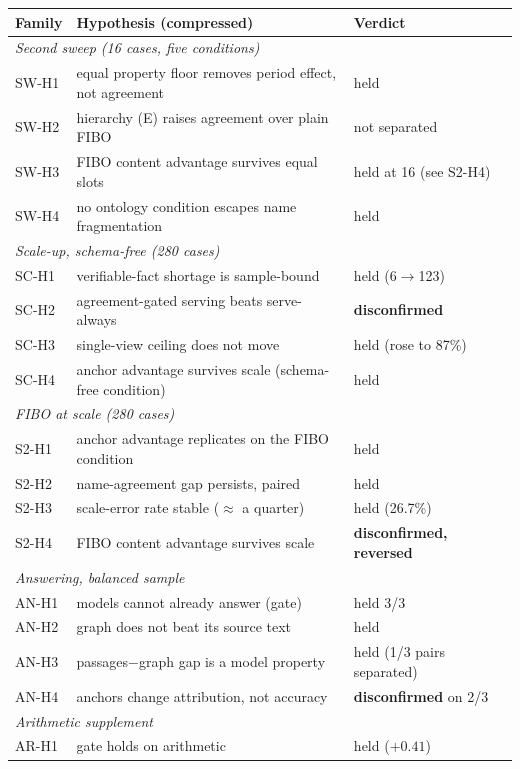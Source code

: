 \documentclass{article}
\begin{document}
\begin{table}[h]
\centering\footnotesize
\setlength{\tabcolsep}{3pt}
\begin{tabular}{llll}
\toprule
Family & Hypothesis (compressed) & Verdict \\
\midrule
\multicolumn{3}{l}{\emph{Second sweep (16 cases, five conditions)}} \\
SW-H1 & equal property floor removes period effect, not agreement & held \\
SW-H2 & hierarchy (E) raises agreement over plain FIBO & not separated \\
SW-H3 & FIBO content advantage survives equal slots & held at 16 (see S2-H4) \\
SW-H4 & no ontology condition escapes name fragmentation & held \\
\midrule
\multicolumn{3}{l}{\emph{Scale-up, schema-free (280 cases)}} \\
SC-H1 & verifiable-fact shortage is sample-bound & held (6$\to$123) \\
SC-H2 & agreement-gated serving beats serve-always & \textbf{disconfirmed} \\
SC-H3 & single-view ceiling does not move & held (rose to 87\%) \\
SC-H4 & anchor advantage survives scale (schema-free condition) & held \\
\midrule
\multicolumn{3}{l}{\emph{FIBO at scale (280 cases)}} \\
S2-H1 & anchor advantage replicates on the FIBO condition & held \\
S2-H2 & name-agreement gap persists, paired & held \\
S2-H3 & scale-error rate stable ($\approx$ a quarter) & held (26.7\%) \\
S2-H4 & FIBO content advantage survives scale & \textbf{disconfirmed, reversed} \\
\midrule
\multicolumn{3}{l}{\emph{Answering, balanced sample}} \\
AN-H1 & models cannot already answer (gate) & held 3/3 \\
AN-H2 & graph does not beat its source text & held \\
AN-H3 & passages$-$graph gap is a model property & held (1/3 pairs separated) \\
AN-H4 & anchors change attribution, not accuracy & \textbf{disconfirmed} on 2/3 \\
\midrule
\multicolumn{3}{l}{\emph{Arithmetic supplement}} \\
AR-H1 & gate holds on arithmetic & held ($+0.41$) \\

\end{tabular}
\end{table}
\end{document}
